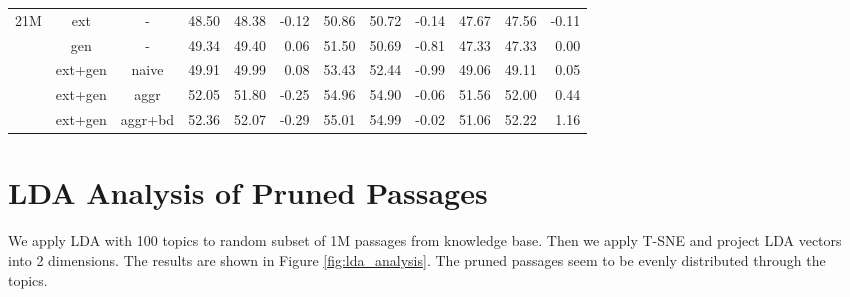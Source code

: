 \documentclass[11pt,a4paper]{article}
\begin{document}
\begin{table*}
{\begin{tabular}{ccc|rrr|rrr|rrr}
\multirow{5}{*}{21M}       & ext                          & -                           & 48.50 & 48.38                       & -0.12                         & 50.86                     & 50.72                       & -0.14                         & 47.67                     & 47.56                       & -0.11                        \\
                           & gen                          & -                           & 49.34 & 49.40                       & 0.06                          & 51.50                     & 50.69                       & -0.81                         & 47.33                     & 47.33                       & 0.00                         \\
                           & ext+gen                      & naive                       & 49.91 & 49.99                       & 0.08                          & 53.43                     & 52.44                       & -0.99                         & 49.06                     & 49.11                       & 0.05                         \\
                           & ext+gen                      & aggr                        & 52.05 & 51.80                       & -0.25                         & 54.96                     & 54.90                       & -0.06                         & 51.56                     & 52.00                       & 0.44                         \\
                           & ext+gen                      & aggr+bd                     & 52.36 & 52.07                       & -0.29                         & 55.01                     & 54.99                       & -0.02                         & 51.06                     & 52.22                       & 1.16                         \\ \bottomrule
\end{tabular} }
\caption{Exact match comparison of Longformer (Long.) and RoBERTa (RoB.) based passage reranker.}
    \label{tab:old_ablation_study}
\end{table*}


\section{LDA Analysis of Pruned Passages}
We apply LDA \cite{blei2003latent} with 100 topics to random subset of 1M passages from knowledge base. Then we apply T-SNE \cite{van2008visualizing} and project LDA vectors into 2 dimensions. The results are shown in Figure \ref{fig:lda_analysis}. The pruned passages seem to be evenly distributed through the topics.

\begin{figure*}[t]
    \centering

    \caption{T-SNE plot of Latent dirichlet allocation (LDA) trained over 1M passages of Wikipedia. Red points are pruned passages from the 1.7M set. Other colors mark passages by their most dominant topic found by LDA. We remove passages with maximum topic weight lesser than 0.2 to clusterize the plot data.}
    \label{fig:lda_analysis}
\end{figure*}
\end{document}
